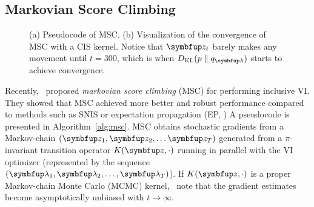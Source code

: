 \subsection{Markovian Score Climbing}
%
\begin{figure}[H]
  \vspace{-0.01in}
  \small
  \centering
  \subfloat[]{
      \label{fig:motivating}
  }
  \caption{(a) Pseudocode of MSC. (b) Visualization of the convergence of MSC with a CIS kernel.
    Notice that \(\vz_t\) barely makes any movement until \(t=300\), which is when \(\DKL{p}{q_{\vlambda}}\) starts to achieve convergence.}
\end{figure}
%
%
Recently,~\citet{NEURIPS2020_b2070693} proposed \textit{markovian score climbing} (MSC) for performing inclusive VI.
They showed that MSC achieved more better and robust performance compared to methods such as SNIS or expectation propagation (EP, \citealt{10.5555/2074022.2074067})
A pseudocode is presented in Algorithm~\ref{alg:msc}.
MSC obtains stochastic gradients from a Markov-chain \((\vz_1, \vz_2, \ldots \vz_T)\) generated from a \(\pi\)-invariant transition operator \(K(\vz, \cdot)\) running in parallel with the VI optimizer (represented by the sequence \((\vlambda_1, \vlambda_2, \ldots, \vlambda_T)\)).
If \(K(\vz, \cdot)\) is a proper Markov-chain Monte Carlo (MCMC) kernel,~\citeauthor{NEURIPS2020_b2070693} note that the gradient estimates become asymptotically unbiased with \(t \rightarrow \infty\).

